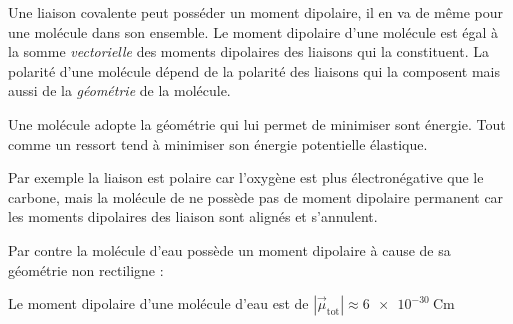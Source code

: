 \documentclass{cours}
\begin{document}
Une liaison covalente peut posséder un moment dipolaire, il en va de même pour une molécule dans son ensemble. Le moment dipolaire d'une molécule est égal à la somme \emph{vectorielle} des moments dipolaires des liaisons qui la constituent. La polarité d'une molécule dépend de la polarité des liaisons qui la composent mais aussi de la \emph{géométrie} de la molécule.

Une molécule adopte la géométrie qui lui permet de minimiser sont énergie. Tout comme un ressort tend à minimiser son énergie potentielle élastique.

Par exemple la liaison  est polaire car l'oxygène est plus électronégative que le carbone, mais la molécule de  ne possède pas de moment dipolaire permanent car les moments dipolaires des liaison sont alignés et s'annulent.
\begin{center}
\end{center}


Par contre la molécule d'eau possède un moment dipolaire à cause de sa géométrie non rectiligne :

\begin{center}
\end{center}
Le moment dipolaire d'une molécule d'eau est de $|\vec \mu_\text{tot}|\approx\SI{6e-30}{\coulomb\meter}$ 
\end{document}
